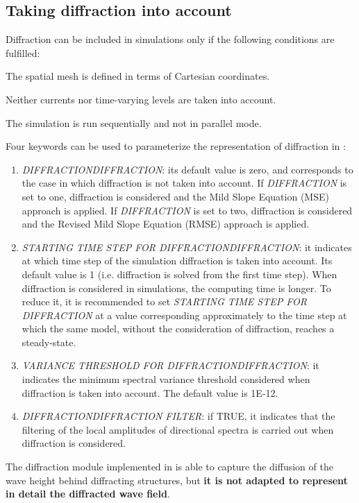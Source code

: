 \subsection{ Taking diffraction into account}

 Diffraction can be included in \tomawac simulations only if the following conditions are fulfilled:

 The spatial mesh is defined in terms of Cartesian coordinates.

 Neither currents nor time-varying levels are taken into account.

 The simulation is run sequentially and not in parallel mode.

 Four keywords can be used to parameterize the representation of diffraction in \tomawac:

\begin{enumerate}
\item  \textit{DIFFRACTIONDIFFRACTION}: its default value is zero, and corresponds to the case in which diffraction is not taken into account. If \textit{DIFFRACTION} is set to one, diffraction is considered and the Mild Slope Equation (MSE) approach is applied. If \textit{DIFFRACTION} is set to two, diffraction is considered and the Revised Mild Slope Equation (RMSE) approach is applied.

\item  \textit{STARTING TIME STEP FOR DIFFRACTIONDIFFRACTION}: it indicates at which time step of the simulation diffraction is taken into account. Its default value is 1 (i.e. diffraction is solved from the first time step). When diffraction is considered in \tomawac simulations, the computing time is longer. To reduce it, it is recommended to set \textit{STARTING TIME STEP FOR DIFFRACTION} at a value corresponding approximately to the time step at which the same \tomawac model, without the consideration of diffraction, reaches a steady-state.

\item  \textit{VARIANCE THRESHOLD FOR DIFFRACTIONDIFFRACTION}: it indicates the minimum spectral variance threshold considered when diffraction is taken into account. The default value is 1E-12.

\item  \textit{DIFFRACTIONDIFFRACTION FILTER}: if TRUE, it indicates that the filtering of the local amplitudes of directional spectra is carried out when diffraction is considered.
\end{enumerate}

 The diffraction module implemented in \tomawac is able to capture the diffusion of the wave height behind diffracting structures, but \textbf{it is not adapted to represent in detail the diffracted wave field}.

